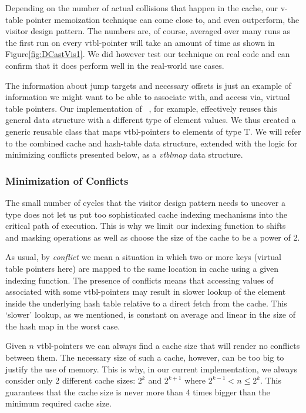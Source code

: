 Depending on the number of actual collisions that happen in the cache, our 
v-table pointer memoization technique can come close to, and even outperform, the 
visitor design pattern. The numbers are, of course, averaged over many runs as 
the first run on every vtbl-pointer will take an amount of time as shown in 
Figure\ref{fig:DCastVis1}. We did however test our technique on real code and 
can confirm that it does perform well in the real-world use cases.

The information about jump targets and necessary offsets is just an example of 
information we might want to be able to associate with, and access via, virtual 
table pointers. Our implementation of ~\cite{TR}, for example, 
effectively reuses this general data structure with a different type of element 
values. We thus created a generic reusable class  that maps 
vtbl-pointers to elements of type T. We will refer to the combined cache and 
hash-table data structure, extended with the logic for minimizing conflicts 
presented below, as a \emph{vtblmap} data structure.

\subsubsection{Minimization of Conflicts}
\label{sec:moc}

The small number of cycles that the visitor design pattern needs to uncover a 
type does not let us put too sophisticated cache indexing mechanisms into the 
critical path of execution. This is why we limit our indexing function to shifts 
and masking operations as well as choose the size of the cache to be a power of 2.

As usual, by \emph{conflict} we mean a situation in which two or more keys (virtual 
table pointers here) are mapped to the same location in cache using a given indexing 
function. The presence of conflicts means that accessing values of  
associated with some vtbl-pointers may result in slower lookup of the element 
inside the underlying hash table relative to a direct fetch from the cache.
This `slower' lookup, as we mentioned, is constant on average and linear in the 
size of the hash map in the worst case.

Given $n$ vtbl-pointers we can always find a cache size that will render no 
conflicts between them. The necessary size of such a cache, however, can be too 
big to justify the use of memory. This is why, in our current implementation, we 
always consider only 2 different cache sizes: $2^k$ and $2^{k+1}$ where 
$2^{k-1} < n \leq 2^k$. This guarantees that the cache size is never more than 4 
times bigger than the minimum required cache size.

